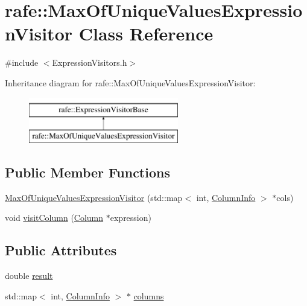 \hypertarget{classrafe_1_1_max_of_unique_values_expression_visitor}{\section{rafe\+:\+:Max\+Of\+Unique\+Values\+Expression\+Visitor Class Reference}
\label{classrafe_1_1_max_of_unique_values_expression_visitor}
}


{\ttfamily \#include $<$Expression\+Visitors.\+h$>$}

Inheritance diagram for rafe\+:\+:Max\+Of\+Unique\+Values\+Expression\+Visitor\+:\begin{figure}[H]
\begin{center}
\leavevmode
\includegraphics[height=2.000000cm]{classrafe_1_1_max_of_unique_values_expression_visitor}
\end{center}
\end{figure}
\subsection*{Public Member Functions}
\begin{DoxyCompactItemize}
\item 
\hyperlink{classrafe_1_1_max_of_unique_values_expression_visitor_ab14921bdb9f894add695d68b23152c09}{Max\+Of\+Unique\+Values\+Expression\+Visitor} (std\+::map$<$ int, \hyperlink{classrafe_1_1_column_info}{Column\+Info} $>$ $\ast$cols)
\item 
void \hyperlink{classrafe_1_1_max_of_unique_values_expression_visitor_af7018ac8dc1f162aa263d16e0c9f757a}{visit\+Column} (\hyperlink{classrafe_1_1_column}{Column} $\ast$expression)
\end{DoxyCompactItemize}
\subsection*{Public Attributes}
\begin{DoxyCompactItemize}
\item 
double \hyperlink{classrafe_1_1_max_of_unique_values_expression_visitor_a759f44c4d4b051aec0f057bead093f77}{result}
\item 
std\+::map$<$ int, \hyperlink{classrafe_1_1_column_info}{Column\+Info} $>$ $\ast$ \hyperlink{classrafe_1_1_max_of_unique_values_expression_visitor_a11f28e944ba731456477cc8ec13c73e5}{columns}
\end{DoxyCompactItemize}


